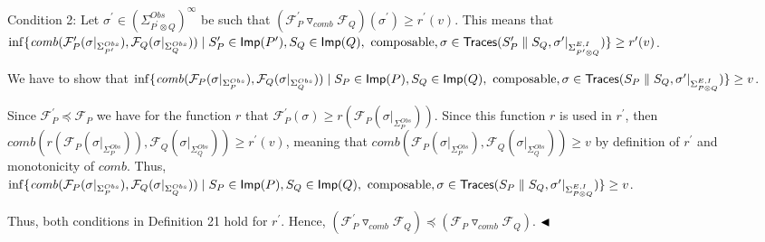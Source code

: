 Condition 2: Let $\sigma^{\prime}\in(\Sigma_{P^{\prime}\otimes Q}^{Obs})^{\infty}$ be such that $({{\mathcal{F}_{P}^{\prime}}\mathbin{\triangledown_{\mathit{comb}}}{\mathcal{F}_{Q}}})(\sigma^{\prime})\geq r^{\prime}(v)$. This means that $\inf\{\mathit{comb}(\mathcal{F}_{P}^{\prime}(\sigma|_{\Sigma_{P^{\prime}}^{Obs}}),\mathcal{F}_{Q}(\sigma|_{\Sigma_{Q}^{Obs}}))\mid\\
S_{P}^{\prime}\in\mathsf{Imp}(P^{\prime}),S_{Q}\in\mathsf{Imp}(Q),\text{ composable},\sigma\in\mathsf{Traces}(S_{P}^{\prime}\parallel S_{Q},\sigma^{\prime}|_{\Sigma_{P^{\prime}\otimes Q}^{E,I}})\}\geq r^{\prime}(v)$.\par
 
 
 
We have to show that $\inf\{\mathit{comb}(\mathcal{F}_{P}(\sigma|_{\Sigma_{P}^{Obs}}),\mathcal{F}_{Q}(\sigma|_{\Sigma_{Q}^{Obs}}))\mid\\
S_{P}\in\mathsf{Imp}(P),S_{Q}\in\mathsf{Imp}(Q),\text{ composable},\sigma\in\mathsf{Traces}(S_{P}\parallel S_{Q},\sigma^{\prime}|_{\Sigma_{P\otimes Q}^{E,I}})\}\geq v$.\par
 
 
 
Since $\mathcal{F}_{P}^{\prime}\preceq\mathcal{F}_{P}$ we have for the function $r$ that $\mathcal{F}_{P}^{\prime}(\sigma)\geq r(\mathcal{F}_{P}(\sigma|_{\Sigma_{P}^{Obs}}))$. Since this function $r$ is used in $r^{\prime}$, then $\mathit{comb}(r(\mathcal{F}_{P}(\sigma|_{\Sigma_{P}^{Obs}})),\mathcal{F}_{Q}(\sigma|_{\Sigma_{Q}^{Obs}}))\geq r^{\prime}(v)$, meaning that $\mathit{comb}(\mathcal{F}_{P}(\sigma|_{\Sigma_{P}^{Obs}}),\mathcal{F}_{Q}(\sigma|_{\Sigma_{Q}^{Obs}}))\geq v$ by definition of $r^{\prime}$ and monotonicity of $\mathit{comb}$. Thus, $\inf\{\mathit{comb}(\mathcal{F}_{P}(\sigma|_{\Sigma_{P}^{Obs}}),\mathcal{F}_{Q}(\sigma|_{\Sigma_{Q}^{Obs}}))\mid\\
S_{P}\in\mathsf{Imp}(P),S_{Q}\in\mathsf{Imp}(Q),\text{ composable},\sigma\in\mathsf{Traces}(S_{P}\parallel S_{Q},\sigma^{\prime}|_{\Sigma_{P\otimes Q}^{E,I}})\}\geq v$.\par
 
 
  
 
 
Thus, both conditions in Definition 21 hold for $r^{\prime}$. Hence, $({{\mathcal{F}_{P}^{\prime}}\mathbin{\triangledown_{\mathit{comb}}}{\mathcal{F}_{Q}}})\!\preceq\!({{\mathcal{F}_{P}}\mathbin{\triangledown_{\mathit{comb}}}{\mathcal{F}_{Q}}})$. $\hfill\blacktriangleleft$\par
 
 
 
\par
 
 
 
